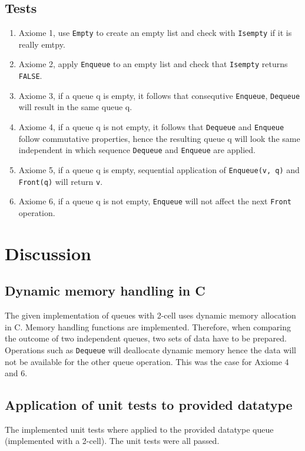 \documentclass[a4paper,11pt,twoside]{article}
\begin{document}
\subsection{Tests}
\begin{enumerate}
  \item Axiome 1, use \texttt{Empty} to create an empty list and check
    with \texttt{Isempty} if it is really emtpy. 
    \item Axiome 2, apply \texttt{Enqueue} to an empty list and check
      that \texttt{Isempty} returns \texttt{FALSE}.
      \item Axiome 3, if a queue q is empty, it follows that 
        consequtive \texttt{Enqueue}, \texttt{Dequeue} will result in
        the same queue q. 
        \item Axiome 4, if a queue q is not empty, it follows that
          \texttt{Dequeue} and \texttt{Enqueue} follow commutative
          properties, hence the resulting queue q will look the same
          independent in which sequence \texttt{Dequeue} and 
          \texttt{Enqueue} are applied.
          \item Axiome 5, if a queue q is empty, sequential
            application of \texttt{Enqueue(v, q)} and
            \texttt{Front(q)} will return \texttt{v}.
            \item Axiome 6, if a queue q is not empty,
              \texttt{Enqueue} will not affect the next \texttt{Front}
              operation. 
\end{enumerate}

\section{Discussion} 
\subsection{Dynamic memory handling in C}
The given implementation of queues with 2-cell uses dynamic memory
allocation in C. Memory handling functions are implemented. Therefore,
when comparing the outcome of two independent queues, two sets of data
have to be prepared. Operations such as \texttt{Dequeue} will
deallocate dynamic memory hence the data will not be available for the
other queue operation. This was the case for Axiome 4 and 6.

\subsection{Application of unit tests to provided datatype}
The implemented unit tests where applied to the provided datatype
queue (implemented with a 2-cell). The unit tests were all passed.


\end{document}
